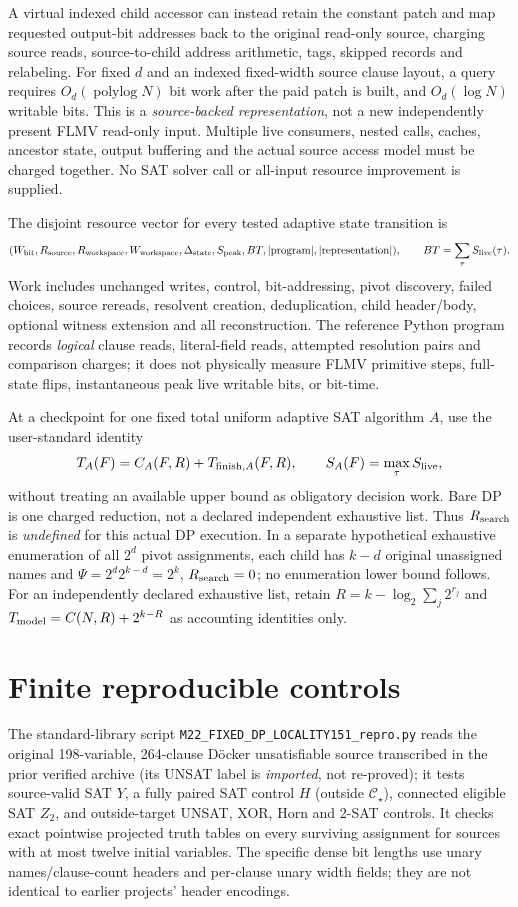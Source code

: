 \documentclass[11pt]{article}
\newcommand{\CS}{\mathcal C_\star}
\begin{document}
A virtual indexed child accessor can instead retain the constant patch and map requested output-bit addresses back to the original read-only source, charging source reads, source-to-child address arithmetic, tags, skipped records and relabeling. For fixed $d$ and an indexed fixed-width source clause layout, a query requires $O_d(\operatorname{polylog}N)$ bit work after the paid patch is built, and $O_d(\log N)$ writable bits. This is a \emph{source-backed representation}, not a new independently present FLMV read-only input. Multiple live consumers, nested calls, caches, ancestor state, output buffering and the actual source access model must be charged together. No SAT solver call or all-input resource improvement is supplied.

\noindent The disjoint resource vector for every tested adaptive state transition is
\[
(W_{\rm bit},R_{\rm source},R_{\rm workspace},W_{\rm workspace},
 \Delta_{\rm state},S_{\rm peak},BT,|\mathrm{program}|,|\mathrm{representation}|),
\qquad BT=\sum_{\tau}S_{\rm live}(\tau).
\]
Work includes unchanged writes, control, bit-addressing, pivot discovery, failed choices, source rereads, resolvent creation, deduplication, child header/body, optional witness extension and all reconstruction. The reference Python program records \emph{logical} clause reads, literal-field reads, attempted resolution pairs and comparison charges; it does not physically measure FLMV primitive steps, full-state flips, instantaneous peak live writable bits, or bit-time.

At a checkpoint for one fixed total uniform adaptive SAT algorithm $A$, use the user-standard identity
\[
T_A(F)=C_A(F,R)+T_{{\rm finish},A}(F,R),\qquad
S_A(F)=\max_\tau S_{\rm live},
\]
without treating an available upper bound as obligatory decision work. Bare DP is one charged reduction, not a declared independent exhaustive list. Thus $R_{\rm search}$ is \emph{undefined} for this actual DP execution. In a separate hypothetical exhaustive enumeration of all $2^d$ pivot assignments, each child has $k-d$ original unassigned names and $\Psi=2^d2^{k-d}=2^k$, $R_{\rm search}=0$; no enumeration lower bound follows. For an independently declared exhaustive list, retain $R=k-\log_2\sum_j2^{r_j}$ and $T_{\rm model}=C(N,R)+2^{k-R}$ as accounting identities only.

\section{Finite reproducible controls}
The standard-library script \texttt{M22\_FIXED\_DP\_LOCALITY151\_repro.py} reads the original 198-variable, 264-clause D\"ocker unsatisfiable source transcribed in the prior verified archive (its UNSAT label is \emph{imported}, not re-proved); it tests source-valid SAT $Y$, a fully paired SAT control $H$ (outside $\CS$), connected eligible SAT $Z_2$, and outside-target UNSAT, XOR, Horn and 2-SAT controls. It checks exact pointwise projected truth tables on every surviving assignment for sources with at most twelve initial variables. The specific dense bit lengths use unary names/clause-count headers and per-clause unary width fields; they are not identical to earlier projects' header encodings.
\end{document}
